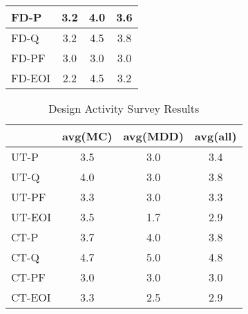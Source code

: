 \documentclass[final_report_innit.tex]{subfiles}
\begin{document}
\begin{table}[h]
\begin{tabular}{@{}l|c|c|c|@{}}
\multicolumn{1}{|l|}{FD-P}   & 3.2                          & 4.0                           & 3.6                           \\ \midrule
\multicolumn{1}{|l|}{FD-Q}   & 3.2                          & 4.5                           & 3.8                           \\ \midrule
\multicolumn{1}{|l|}{FD-PF}  & 3.0                          & 3.0                           & 3.0                           \\ \midrule
\multicolumn{1}{|l|}{FD-EOI} & 2.2                          & 4.5                           & 3.2                           \\ \bottomrule
\end{tabular}
\end{table}

\begin{table}[h]
\caption{Design Activity Survey Results}
\centering
\begin{tabular}{@{}l|c|c|c|@{}}
\cmidrule(l){2-4}
                             & \multicolumn{1}{l|}{avg(MC)} & \multicolumn{1}{l|}{avg(MDD)} & \multicolumn{1}{l|}{avg(all)} \\ \midrule
\multicolumn{1}{|l|}{UT-P}   & 3.5                          & 3.0                           & 3.4                           \\ \midrule
\multicolumn{1}{|l|}{UT-Q}   & 4.0                          & 3.0                           & 3.8                           \\ \midrule
\multicolumn{1}{|l|}{UT-PF}  & 3.3                          & 3.0                           & 3.3                           \\ \midrule
\multicolumn{1}{|l|}{UT-EOI} & 3.5                          & 1.7                           & 2.9                           \\ \midrule
\multicolumn{1}{|l|}{CT-P}   & 3.7                          & 4.0                           & 3.8                           \\ \midrule
\multicolumn{1}{|l|}{CT-Q}   & 4.7                          & 5.0                           & 4.8                           \\ \midrule
\multicolumn{1}{|l|}{CT-PF}  & 3.0                          & 3.0                           & 3.0                           \\ \midrule
\multicolumn{1}{|l|}{CT-EOI} & 3.3                          & 2.5                           & 2.9                           \\ \bottomrule
\end{tabular}
\end{table}
\end{document}
